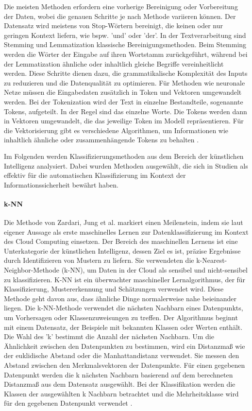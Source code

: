 Die meisten Methoden erfordern eine vorherige Bereinigung oder Vorbereitung der Daten, wobei die genauen Schritte je nach Methode variieren können. Der Datensatz wird meistens von Stop-Wörtern bereinigt, die keinen oder nur geringen Kontext liefern, wie bspw. 'und' oder 'der'. In der Textverarbeitung sind Stemming und Lemmatization klassische Bereinigungsmethoden. Beim Stemming werden die Wörter der Eingabe auf ihren Wortstamm zurückgeführt, während bei der Lemmatization ähnliche oder inhaltlich gleiche Begriffe vereinheitlicht werden.
Diese Schritte dienen dazu, die grammatikalische Komplexität des Inputs zu reduzieren und die Datenqualität zu optimieren. Für Methoden wie neuronale Netze müssen die Eingabedaten zusätzlich in Token und Vektoren umgewandelt werden. Bei der Tokenization wird der Text in einzelne Bestandteile, sogenannte Tokens, aufgeteilt. In der Regel sind das einzelne Worte. Die Tokens werden dann in Vektoren umgewandelt, die das jeweilige Token im Modell repräsentieren. Für die Vektorisierung gibt es verschiedene Algorithmen, um Informationen wie inhaltlich ähnliche oder zusammenhängende Tokens zu behalten \cite{Kamath.2019}.

Im Folgenden werden Klassifizierungsmethoden aus dem Bereich der künstlichen Intelligenz analysiert. Dabei wurden Methoden ausgewählt, die sich in Studien als effektiv für die automatischen Klassifizierung im Kontext der Informationssicherheit bewährt haben.


\paragraph{k-NN}
Die Methode von Zardari, Jung et al. \cite{Zardari.2014} markiert einen Meilenstein, indem sie laut eigener Aussage als erste maschinelles Lernen zur Datenklassifizierung im Kontext des Cloud Computing einsetzen. Der Bereich des maschinellen Lernens ist eine Unterkategorie der künstlichen Intelligenz, dessen Ziel es ist, präzise Ergebnisse durch Identifizieren von Mustern zu liefern. Sie verwendeten die k-Nearest-Neighbor-Methode (k-NN), um Daten in der Cloud als sensibel und nicht-sensibel zu klassifizieren. K-NN ist ein überwachter maschineller Lernalgorithmus, der für Klassifizierung, Mustererkennung und Schätzungen verwendet wird. Diese Methode geht davon aus, dass ähnliche Dinge normalerweise nahe beieinander liegen. Die k-NN-Methode verwendet die nächsten Nachbarn eines Datenpunkts, um Vorhersagen oder Klassenzuweisungen zu treffen. Der Algorithmus beginnt mit einem Datensatz, der Beispiele mit bekannten Klassen oder Werten enthält. Die Wahl des 'k' bestimmt die Anzahl der nächsten Nachbarn. Um die Ähnlichkeit zwischen den Datenpunkten zu bestimmen, wird ein Distanzmaß wie der euklidische Abstand oder die Manhattandistanz verwendet. Sie messen den Abstand zwischen den Merkmalsvektoren der Datenpunkte. Für einen gegebenen Datenpunkt werden die k nächsten Nachbarn basierend auf dem berechneten Distanzmaß aus dem Datensatz ausgewählt. Bei der Klassifikation werden die Klassen der ausgewählten k Nachbarn betrachtet und die Mehrheitsklasse wird für den gegebenen Datenpunkt verwendet \cite{Frochte.2018b}.

